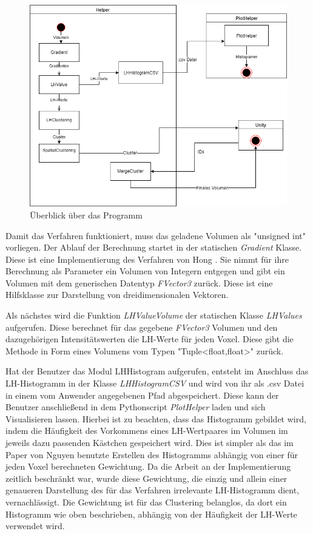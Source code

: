 \begin{figure}
\centering 
\includegraphics[width=\textwidth]{Logos/Ueberblick.png}
\caption{Überblick über das Programm} 
\label{fig:ueberblick} 
\end{figure}


Damit das Verfahren funktioniert, muss das geladene Volumen als "unsigned int" vorliegen. Der Ablauf der Berechnung startet in der statischen \textit{Gradient} Klasse. Diese ist eine Implementierung des Verfahren von Hong \cite{hong2003method}. Sie nimmt für ihre Berechnung als Parameter ein Volumen von Integern entgegen und gibt ein Volumen mit dem generischen Datentyp \textit{FVector3} zurück. Diese ist eine Hilfsklasse zur Darstellung von dreidimensionalen Vektoren.

Als nächstes wird die Funktion \textit{LHValueVolume} der statischen Klasse \textit{LHValues} aufgerufen. Diese berechnet für das gegebene \textit{FVector3} Volumen und den dazugehörigen Intensitätswerten die LH-Werte für jeden Voxel. Diese gibt die Methode in Form eines Volumens vom Typen "Tuple<float,float>" zurück.

Hat der Benutzer das Modul LHHistogram aufgerufen, entsteht im Anschluss das LH-Histogramm in der Klasse \textit{LHHistogramCSV} und wird von ihr als .csv Datei in einem vom Anwender angegebenen Pfad abgespeichert. Diese kann der Benutzer anschließend in dem Pythonscript \textit{PlotHelper}  laden und sich Visualisieren lassen. Hierbei ist zu beachten, dass das Histogramm gebildet wird, indem die Häufigkeit des Vorkommens eines LH-Wertpaares im Volumen im jeweils dazu passenden Kästchen gespeichert wird. Dies ist simpler als das im Paper von Nguyen \cite{nguyen2012clustering} benutzte Erstellen des Histogramms abhängig von einer für jeden Voxel berechneten Gewichtung. Da die Arbeit an der Implementierung zeitlich beschränkt war, wurde diese Gewichtung, die einzig und allein einer genaueren Darstellung des für das Verfahren irrelevante LH-Histogramm dient, vernachlässigt. Die Gewichtung ist für das Clustering belanglos, da dort ein Histogramm wie oben beschrieben, abhängig von der Häufigkeit der LH-Werte verwendet wird. 


